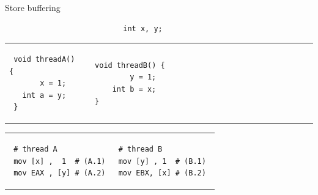 \begin{frame}[fragile,t]{Store buffering}
 
 \begin{verbatim}
                           int x, y;
 \end{verbatim}
 
 \begin{tabular}{p{} p{}} 
 \begin{verbatim}
 void threadA() {
       x = 1;
   int a = y;
 }
 \end{verbatim}
 &  
 \begin{verbatim}
 void threadB() {                                   
         y = 1;                           
     int b = x;                           
 }                    
 \end{verbatim}
 \end{tabular}
 
 \pause
 
 \begin{tabular}{p{} p{}}
 \begin{verbatim}
 # thread A
 mov [x] ,  1  # (A.1)
 mov EAX , [y] # (A.2)
 \end{verbatim}
 
 & 
 
 \begin{verbatim}
 # thread B          
 mov [y] , 1  # (B.1) 
 mov EBX, [x] # (B.2) 
 \end{verbatim}
 \end{tabular}
 
 \end{frame}


